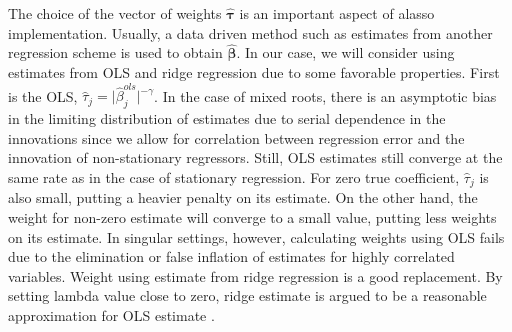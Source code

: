 \documentclass[12pt,a4paper]{article}
\begin{document}
The choice of the vector of weights $ \hat{\bm{\tau}} $ is an important aspect of alasso implementation. Usually, a data driven method such as estimates from another regression scheme is used to obtain $ \hat{\bm{\beta}}$. In our case, we will consider using estimates from OLS and ridge regression due to some favorable properties. First is the OLS, $ \hat{\tau}_j = \vert\hat{\beta}_j^{ols}\vert^{-\gamma} $. In the case of mixed roots, there is an asymptotic bias in the limiting distribution of estimates due to serial dependence in the innovations since we allow for correlation between regression error and the innovation of non-stationary regressors. Still, OLS estimates still converge at the same rate as in the case of stationary regression. For zero true coefficient, $ \hat{\tau}_j $ is also small, putting a heavier penalty on its estimate. On the other hand, the weight for non-zero estimate will converge to a small value, putting less weights on its estimate. In singular settings, however, calculating weights using OLS fails due to the elimination or false inflation of estimates for highly correlated variables. Weight using estimate from ridge regression is a good replacement. By setting lambda value close to zero, ridge estimate is argued to be a reasonable approximation for OLS estimate \citep{knight2000asymptotics}.
\end{document}
